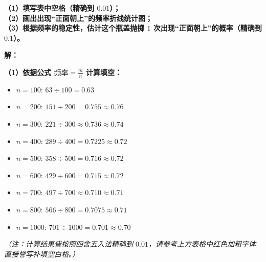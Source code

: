 \documentclass[12pt, a4paper]{ctexrep}
\begin{document}
\vspace{0.3cm}
\begin{center}
\renewcommand{\arraystretch}{1.8}
\end{center}

\vspace{0.4cm}
\textbf{（1）填写表中空格（精确到 $0.01$）；\\
（2）画出出现“正面朝上”的频率折线统计图；\\
（3）根据频率的稳定性，估计这个瓶盖抛掷 $1$ 次出现“正面朝上”的概率（精确到 $0.1$）。}

\vspace{0.4cm}
\textbf{解：}

\textbf{（1）依据公式 $\text{频率} = \frac{m}{n}$ 计算填空：}
\begin{itemize}
    \item $n=100$: $63 \div 100 = 0.63$
    \item $n=200$: $151 \div 200 = 0.755 \approx 0.76$
    \item $n=300$: $221 \div 300 \approx 0.736 \approx 0.74$
    \item $n=400$: $289 \div 400 = 0.7225 \approx 0.72$
    \item $n=500$: $358 \div 500 = 0.716 \approx 0.72$
    \item $n=600$: $429 \div 600 = 0.715 \approx 0.72$
    \item $n=700$: $497 \div 700 \approx 0.710 \approx 0.71$
    \item $n=800$: $566 \div 800 = 0.7075 \approx 0.71$
    \item $n=1000$: $701 \div 1000 = 0.701 \approx 0.70$
\end{itemize}
\textit{（注：计算结果皆按照四舍五入法精确到 $0.01$，请参考上方表格中红色加粗字体直接誉写补填空白格。）}
\end{document}
